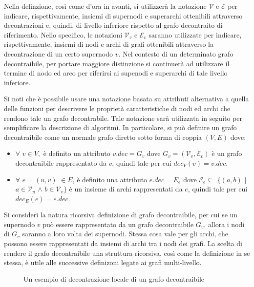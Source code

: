 Nella definzione, cos\`{i} come d'ora in avanti, si utilizzer\`a la notazione $\mathcal{V}$ e $\mathcal{E}$ per
indicare, rispettivamente, insiemi di supernodi e superarchi ottenibili attraverso decontrazioni e, quindi, di
livello inferiore rispetto al grafo decontraito di riferimento.
Nello specifico, le notazioni $\mathcal{V}_v$ e $\mathcal{E}_v$ saranno utilizzate per indicare, rispettivamente,
insiemi di nodi e archi di grafi ottenibili attraverso la decontrazione di un certo supernodo $v$.
Nel contesto di un determinato grafo decontraibile, per portare maggiore distinzione si continuer\`a ad utilizzare
il termine di nodo ed arco per riferirsi ai supenodi e superarchi di tale livello inferiore. \newline

Si noti che \`e possibile usare una notazione basata su attributi alternativa a quella delle funzioni per
descrivere le propriet\`a caratteristiche di nodi ed archi che rendono tale un grafo decontrabile.
Tale notazione sar\`a utilizzata in seguito per semplificare la descrizione di algoritmi. \newline
In particolare, si pu\`o definire un grafo decontraibile come un normale grafo diretto sotto forma di coppia
$(V, E)$ dove:
\begin{itemize}
    \item $\forall$ $v \in V,$ \`e definito un attributo $v.dec = G_v$ dove $G_v = (\mathcal{V}_v, \mathcal{E}_v)$ \`e un
        grafo decontraibile rappresentato da $v$, quindi tale per cui $dec_V(v) = v.dec$.
    \item $\forall$ $e=(u, v)$  $\in E$, \`e definito una attributo $e.dec = E_e$ dove
        $\mathcal{E}_e \subseteq$ $\{(a, b)$ $\mid$ $a \in \mathcal{V}_u$ $\wedge$ $b \in \mathcal{V}_v\}$ \`e un insieme di archi
        rappresentati da $e$, quindi tale per cui $dec_E(e) = e.dec$.
\end{itemize}

Si consideri la natura ricorsiva definizione di grafo decontraibile, per cui se un supernodo $v$ pu\`o essere
rappresentato da un grafo decontraibile $G_v$, allora i nodi di $G_v$ saranno a loro volta dei supernodi.
Stessa cosa vale per gli archi, che possono essere rappresentati da insiemi di archi tra i nodi dei grafi.
La scelta di rendere il grafo decontraibile una struttura ricorsiva, cos\`{i} come la definizione in se stessa,
\`e utile alle successive definizoni legate ai grafi multi-livello. \newline

\begin{figure}[h!]
\centering

\caption{Un esempio di decontrazione locale di un grafo decontraibile}
\label{fig:dec-graph-example}
\end{figure}


